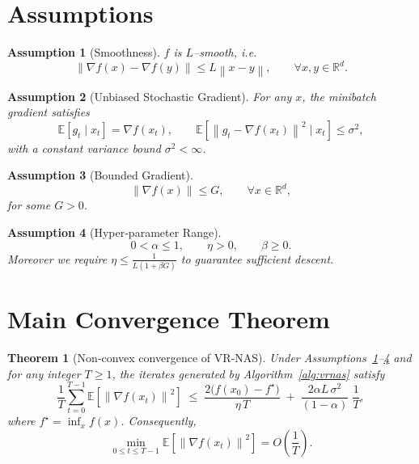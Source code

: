 \documentclass{article}
\newtheorem{assumption}{Assumption}
\newtheorem{theorem}{Theorem}
\newcommand{\E}{\mathbb{E}}
\newcommand{\norm}[1]{\left\|#1\right\|}
\newcommand{\grad}{\nabla}
\begin{document}
\section*{Assumptions}
\begin{assumption}[Smoothness]\label{as:smooth}
$f$ is $L$–smooth, i.e.
\[
\norm{\grad f(x)-\grad f(y)}\le L\norm{x-y},\qquad\forall x,y\in\mathbb{R}^{d}.
\]
\end{assumption}

\begin{assumption}[Unbiased Stochastic Gradient]\label{as:unbiased}
For any $x$, the minibatch gradient satisfies
\[
\E[g_{t}\mid x_{t}]=\grad f(x_{t}),\qquad 
\E\!\left[\norm{g_{t}-\grad f(x_{t})}^{2}\mid x_{t}\right]\le\sigma^{2},
\]
with a constant variance bound $\sigma^{2}<\infty$.
\end{assumption}

\begin{assumption}[Bounded Gradient]\label{as:bounded}
\[
\norm{\grad f(x)}\le G,\qquad\forall x\in\mathbb{R}^{d},
\]
for some $G>0$.
\end{assumption}

\begin{assumption}[Hyper‑parameter Range]\label{as:hyper}
\[
0<\alpha\le 1,\qquad \eta>0,\qquad \beta\ge 0.
\]
Moreover we require $\eta\le \frac{1}{L(1+\beta G)}$ to guarantee sufficient descent.
\end{assumption}

\section*{Main Convergence Theorem}
\begin{theorem}[Non‑convex convergence of VR‑NAS]\label{thm:main}
Under Assumptions~\ref{as:smooth}–\ref{as:hyper} and for any integer $T\ge 1$, the iterates generated by Algorithm~\ref{alg:vrnas} satisfy
\[
\frac{1}{T}\sum_{t=0}^{T-1}\E\!\left[\norm{\grad f(x_{t})}^{2}\right]
\;\le\;
\frac{2\bigl(f(x_{0})-f^{\star}\bigr)}{\eta\,T}
\;+\;
\frac{2\alpha L\,\sigma^{2}}{(1-\alpha)}\;
\frac{1}{T},
\tag{5}
\]
where $f^{\star}=\inf_{x}f(x)$. Consequently,
\[
\min_{0\le t\le T-1}\E\!\left[\norm{\grad f(x_{t})}^{2}\right]
= O\!\left(\frac{1}{T}\right).
\]
\end{theorem}
\end{document}
